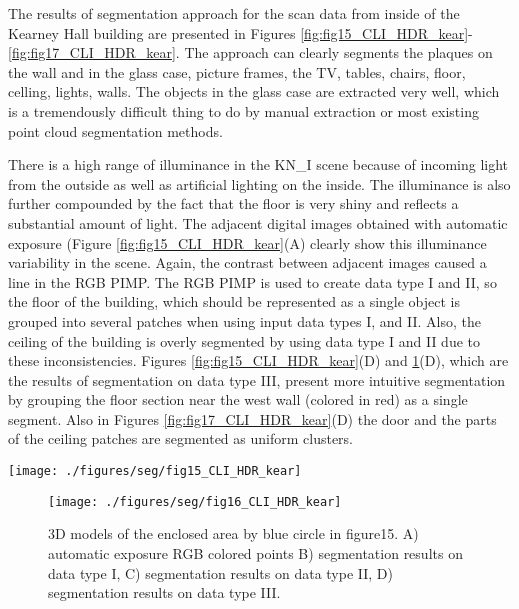 \documentclass[final,3p,times,twocolumn,authoryear]{elsarticle}
\begin{document}
The results of segmentation approach for the scan data from inside of the Kearney Hall building are presented in Figures \ref{fig:fig15_CLI_HDR_kear}-\ref{fig:fig17_CLI_HDR_kear}.
The approach can clearly segments the plaques on the wall and in the glass case, picture frames, the TV, tables, chairs, floor, celling, lights, walls. The objects in the glass case are extracted very well, which is a tremendously difficult thing to do by manual extraction or most existing point cloud segmentation methods. 

There is a high range of illuminance in the KN\_I scene because of incoming light from the outside as well as artificial lighting on the inside.  The illuminance is also further compounded by the fact that the floor is very shiny and reflects a substantial amount of light. The adjacent digital images obtained with automatic exposure (Figure \ref{fig:fig15_CLI_HDR_kear}(A) clearly show this illuminance variability in the scene. Again, the contrast between adjacent images caused a line in the RGB PIMP. The RGB PIMP is used to create data type I and II, so the floor of the building, which should be represented as a single object is grouped into several patches when using input data types I, and II. Also, the ceiling of the building is overly segmented by using data type I and II due to these inconsistencies. Figures \ref{fig:fig15_CLI_HDR_kear}(D) and \ref{fig:fig16_CLI_HDR_kear}(D), which are the results of segmentation on data type III, present more intuitive segmentation by grouping the floor section near the west wall (colored in red) as a single segment. Also in Figures \ref{fig:fig17_CLI_HDR_kear}(D) the door and the parts of the ceiling patches are segmented as uniform clusters. 


\begin{figure*}
	\centering
	\texttt{[image: ./figures/seg/fig15\_CLI\_HDR\_kear]}
	\caption{A) RGB PIMP for the KN\_I scan scene. The influence of data improvement techniques on the KN\_I scan scene are shown for data types I (B), II (C), and III (D).}
	\label{fig:fig15_CLI_HDR_kear}
\end{figure*}

\begin{figure}[h]
	\centering
	\texttt{[image: ./figures/seg/fig16\_CLI\_HDR\_kear]}
	\caption{3D models of the enclosed area by blue circle in figure15. A) automatic exposure RGB colored points B) segmentation results on data type I, C) segmentation results on data type II, D) segmentation results on data type III.}
	\label{fig:fig16_CLI_HDR_kear}
\end{figure}
\end{document}
